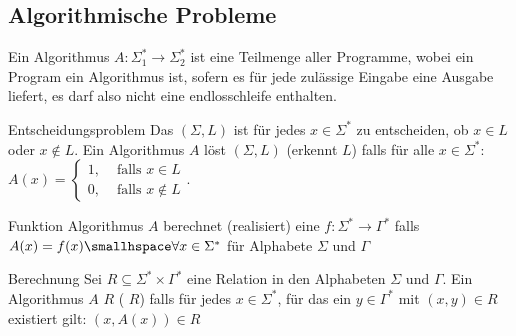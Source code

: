 \newpage
\subsection{Algorithmische Probleme}
Ein Algorithmus $A : \Sigma_1^* \rightarrow \Sigma_2^*$ ist eine Teilmenge aller Programme, wobei ein Program ein Algorithmus ist, sofern es für jede zulässige Eingabe eine Ausgabe liefert, es darf also nicht eine endlosschleife enthalten.

\begin{definition}[]{Entscheidungsproblem}
    Das  $(\Sigma, L)$ ist für jedes $x \in \Sigma^*$ zu entscheiden, ob $x \in L$ oder $x \notin L$. 
    Ein Algorithmus $A$ löst $(\Sigma, L)$ (erkennt $L$) falls für alle $x \in \Sigma^*$: $A(x) = \begin{cases}
        1, &\text{ falls } x \in L\\
        0, &\text{ falls } x \notin L
    \end{cases}$.
\end{definition}

\begin{definition}[]{Funktion}
    Algorithmus $A$ berechnet (realisiert) eine  $f: \Sigma^* \rightarrow \Gamma^*$ falls $A(x) = f(x) \smallhspace \forall x \in \Sigma^*$ für Alphabete $\Sigma$ und $\Gamma$
\end{definition}


\begin{definition}[]{Berechnung}
    Sei $R \subseteq \Sigma^* \times \Gamma^*$ eine Relation in den Alphabeten $\Sigma$ und $\Gamma$. 
    Ein Algorithmus $A$  $R$ ( $R$) falls für jedes $x \in \Sigma^*$, für das ein $y \in \Gamma^*$ mit $(x, y) \in R$ existiert gilt:
    $(x, A(x)) \in R$
\end{definition}
